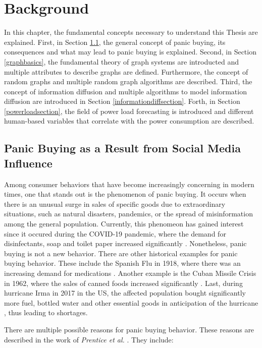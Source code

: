 \chapter{Background}
\label{background}

In this chapter, the fundamental concepts necessary to understand 
this Thesis are explained.
First, in Section \ref{panicbuying}, 
the general concept of panic buying,
its consequences and what may lead to panic buying is explained.
Second, in Section \ref{graphbasics}, 
the fundamental theory of graph systems are 
introducted and multiple attributes to describe graphs are defined.
Furthermore, the concept of random graphs and multiple random 
graph algorithms are described.
Third, the concept of information diffusion
and multiple algorithms to model information diffusion are introduced
in Section \ref{informationdiffsection}.
Forth, in Section \ref{powerloadsection}, 
the field of power load forecasting is introduced and 
different human-based variables that 
correlate with the power consumption are described.


\section{Panic Buying as a Result from Social Media Influence}
\label{panicbuying}

Among consumer behaviors that have become increasingly concerning in modern times, 
one that stands out is the phenomenon of panic buying.
It occurs when there is an unusual surge in sales of 
specific goods due to extraordinary situations, such as natural disasters, 
pandemics, or the spread of misinformation among the general population.
Currently, this phenomeon has gained interest since it occured
during the COVID-19 pandemic,
where the demand for disinfectants, soap and toilet paper increased significantly
\cite{covidpanicbuying}. Nonetheless, panic buying is not a new behavior.
There are other historical examples for panic buying behavior.
These include the Spanish Flu
in 1918, where there was an increasing demand for medications 
\cite{honigsbaum2013regulating}. Another example is the Cuban Missile Crisis 
in 1962, where the sales of canned foods increased significantly 
\cite{george2004awaiting}. 
Last, during hurricane Irma in 2017 in the US, the affected population bought
significantly more fuel, bottled water 
and other essential goods in anticipation of the hurricane \cite{irmahurricane},
thus leading to shortages.

There are multiple possible reasons for panic buying behavior. These reasons 
are described in the work of \textit{Prentice et al.}
\cite{prentice2022antecedents}. They include:

